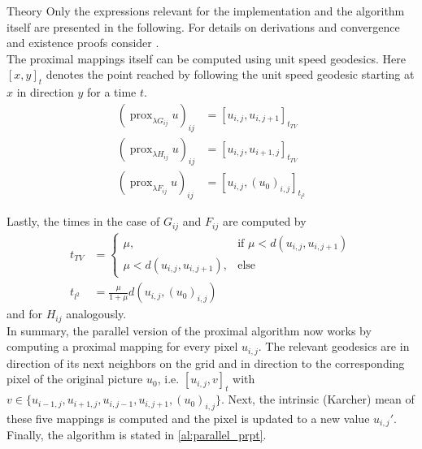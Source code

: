 \begin{chapter}{Theory}
Only the expressions relevant for the implementation and the algorithm itself are presented in the following. For details on derivations and convergence and existence proofs consider \cite{Weinmann}.\\

The proximal mappings itself can be computed using unit speed geodesics. Here $[x,y]_t$ denotes the point reached by
following the unit speed geodesic starting at $x$ in direction $y$ for a time $t$.
\begin{align}
    (\operatorname{prox}_{\lambda G_{ij}}u)_{ij}&=[u_{i,j},u_{i,j+1}]_{t_{TV}} \\
    (\operatorname{prox}_{\lambda H_{ij}}u)_{ij}&=[u_{i,j},u_{i+1,j}]_{t_{TV}} \\
    (\operatorname{prox}_{\lambda F_{ij}}u)_{ij}&=[u_{i,j},(u_0)_{i,j}]_{t_{l^2}}
\end{align}

Lastly, the times in the case of $G_{ij}$ and $F_{ij}$ are computed by
\begin{align}
    t_{TV}&=
    \begin{cases}
	\mu, &\text{if } \mu<d(u_{i,j},u_{i,j+1})\\
	\mu<d(u_{i,j},u_{i,j+1}), & \text{else}
    \end{cases}\\
    t_{l^{2}}&=\frac{\mu}{1+\mu}d(u_{i,j},(u_0)_{i,j})
\end{align}
and for $H_{ij}$ analogously.\\

In summary, the parallel version of the proximal algorithm now works by computing a proximal mapping for every pixel $u_{i,j}$.
The relevant geodesics are in direction of its next neighbors on the grid and in direction to the corresponding pixel of the original picture $u_0$, i.e. $[u_{i,j}, v]_t$ with $v\in\lbrace u_{i-1,j},u_{i+1,j},u_{i,j-1}, u_{i,j+1}, (u_0)_{i,j}\rbrace$. Next, the intrinsic (Karcher) mean \cite{Karcher} of 
these five mappings is computed and the pixel is updated to a new value $u_{i,j}'$.\\

Finally, the algorithm is stated in \ref{al:parallel_prpt}.


\end{chapter}

